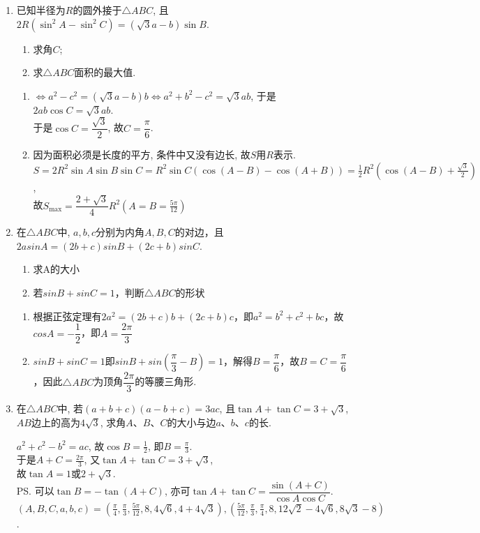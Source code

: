 \begin{enumerate}
\item 已知半径为$R$的圆外接于$\triangle{ABC}$, 且$2R(\sin^2A-\sin^2C)=(\sqrt{3}a-b)\sin{B}$. 
\begin{enumerate}
\item 求角$C$; 
\item 求$\triangle{ABC}$面积的最大值. 
\end{enumerate}
\begin{jieda}
\begin{enumerate}
\item $\iff a^2-c^2=(\sqrt{3}a-b)b\iff a^2+b^2-c^2=\sqrt{3}ab$, 于是$2ab\cos{C}=\sqrt{3}ab$. \\
于是$\cos{C}=\dfrac{\sqrt{3}}{2}$, 故$C=\dfrac{\pi}{6}$. 

\item 因为面积必须是长度的平方, 条件中又没有边长, 故$S$用$R$表示. \\
$S=2R^2\sin{A}\sin{B}\sin{C}=R^2\sin{C}(\cos(A-B)-\cos(A+B))=\frac{1}{2}R^2(\cos(A-B)+\frac{\sqrt{3}}{2})$, \\
故$S_{\max}=\dfrac{2+\sqrt{3}}{4}R^2(A=B=\frac{5\pi}{12})$
\end{enumerate}
\end{jieda}


\item 在$\triangle{ABC}$中, $a,b,c$分别为内角$A,B,C$的对边，且$2asinA=(2b+c)sinB+(2c+b)sinC$.
\begin{enumerate}
    \item 求A的大小
    \item 若$sinB + sinC = 1$，判断$\triangle{ABC}$的形状
\end{enumerate}
\begin{jieda}
    \begin{enumerate}
        \item 根据正弦定理有$2a^2=(2b+c)b+(2c+b)c$，即$a^2 = b^2+c^2+bc$，故$cosA = -\dfrac{1}{2}$，即$A = \dfrac{2\pi}{3}$
        \item $sinB + sinC = 1$即$sinB + sin(\dfrac{\pi}{3} - B) = 1$，解得$B = \dfrac{\pi}{6}$，故$B = C = \dfrac{\pi}{6}$，因此$\triangle{ABC}$为顶角$\dfrac{2\pi}{3}$的等腰三角形.
    \end{enumerate}
\end{jieda}

\item 在$\triangle{ABC}$中, 若$(a+b+c)(a-b+c)=3ac$, 且$\tan{A}+\tan{C}=3+\sqrt{3}$, $AB$边上的高为$4\sqrt{3}$, 求角$A$、$B$、$C$的大小与边$a$、$b$、$c$的长.
\begin{jieda}
$a^2+c^2-b^2=ac$, 故$\cos{B}=\frac{1}{2}$, 即$B=\frac{\pi}{3}$. \\
于是$A+C=\frac{2\pi}{3}$, 又$\tan{A}+\tan{C}=3+\sqrt{3}$, \\
故$\tan{A}=1$或$2+\sqrt{3}$. \\
\ps 可以$\tan{B}=-\tan(A+C)$, 亦可$\tan{A}+\tan{C}=\dfrac{\sin(A+C)}{\cos{A}\cos{C}}$. \\
$(A,B,C,a,b,c)=(\frac{\pi}{4},\frac{\pi}{3},\frac{5\pi}{12},8,4\sqrt{6},4+4\sqrt{3}), (\frac{5\pi}{12},\frac{\pi}{3},\frac{\pi}{4},8,12\sqrt{2}-4\sqrt{6},8\sqrt{3}-8)$. 
\end{jieda}

\end{enumerate}
